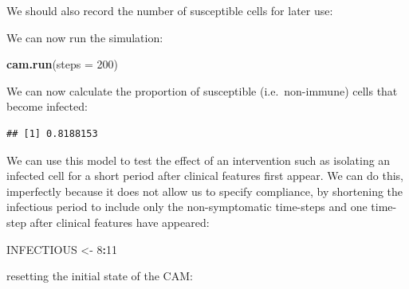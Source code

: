 \documentclass[12pt,a4paper]{book}
\newenvironment{Shaded}{\begin{snugshade}}{\end{snugshade}}
\newcommand{\KeywordTok}[1]{\textcolor[rgb]{0.13,0.29,0.53}{\textbf{#1}}}
\newcommand{\DataTypeTok}[1]{\textcolor[rgb]{0.13,0.29,0.53}{#1}}
\newcommand{\DecValTok}[1]{\textcolor[rgb]{0.00,0.00,0.81}{#1}}
\newcommand{\StringTok}[1]{\textcolor[rgb]{0.31,0.60,0.02}{#1}}
\newcommand{\OperatorTok}[1]{\textcolor[rgb]{0.81,0.36,0.00}{\textbf{#1}}}
\newcommand{\NormalTok}[1]{#1}
\theoremstyle{definition}
\theoremstyle{definition}
\theoremstyle{definition}
\theoremstyle{remark}
\begin{document}
We should also record the number of susceptible cells for later use:

\begin{Shaded}
\end{Shaded}

We can now run the simulation:

\begin{Shaded}
\begin{Highlighting}[]
\KeywordTok{cam.run}\NormalTok{(}\DataTypeTok{steps =} \DecValTok{200}\NormalTok{)}
\end{Highlighting}
\end{Shaded}

We can now calculate the proportion of susceptible (i.e.~non-immune)
cells that become infected:

\begin{Shaded}
\end{Shaded}

\begin{verbatim}
## [1] 0.8188153
\end{verbatim}

We can use this model to test the effect of an intervention such as
isolating an infected cell for a short period after clinical features
first appear. We can do this, imperfectly because it does not allow us
to specify compliance, by shortening the infectious period to include
only the non-symptomatic time-steps and one time- step after clinical
features have appeared:

\begin{Shaded}
\begin{Highlighting}[]
\NormalTok{INFECTIOUS <-}\StringTok{ }\DecValTok{8}\OperatorTok{:}\DecValTok{11}
\end{Highlighting}
\end{Shaded}

resetting the initial state of the CAM:
\end{document}
